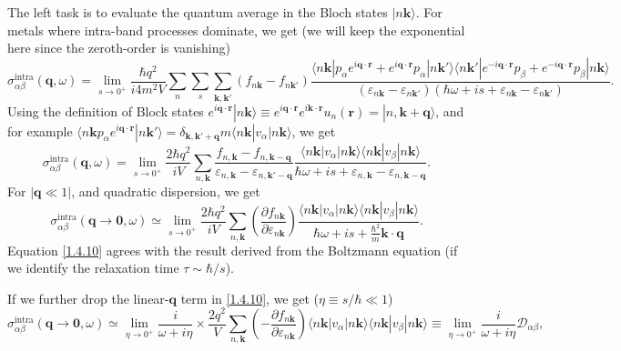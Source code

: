 \documentclass[10pt,nofootinbib,letterpaper]{revtex4}
\begin{document}
		\indent The left task is to evaluate the quantum average in the Bloch states $|n\bm{k}\rangle$. For metals where intra-band processes dominate, we get (we will keep the exponential here since the zeroth-order is vanishing)
		\begin{equation*}
			\sigma_{\alpha\beta}^{\text{intra}}(\bm{q},\omega)=\lim_{s \rightarrow0^+}\dfrac{\hbar q^2}{i4m^2V}\sum_{n}\sum_s\sum_{\bm{k},\bm{k'}}(f_{n\bm{k}}-f_{n\bm{k'}})\dfrac{\langle n\bm{k}|p_\alpha e^{i\bm{q}\cdot\bm{r}}+e^{i\bm{q}\cdot\bm{r}}p_\alpha|n\bm{k'}\rangle\langle n\bm{k'}|e^{-i\bm{q}\cdot\bm{r}}p_\beta+e^{-i\bm{q}\cdot\bm{r}}p_\beta|n\bm{k}\rangle}{(\varepsilon_{n\bm{k}}-\varepsilon_{n\bm{k'}})(\hbar\omega+is+\varepsilon_{n\bm{k}}-\varepsilon_{n\bm{k'}})}.
		\end{equation*}
		Using the definition of Block states $e^{i\bm{q}\cdot\bm{r}}|n\bm{k}\rangle\equiv e^{i\bm{q}\cdot\bm{r}}e^{i\bm{k}\cdot\bm{r}}u_n(\bm{r})=|n,\bm{k}+\bm{q}\rangle$, and for example $\langle n\bm{k}p_\alpha e^{i\bm{q}\cdot\bm{r}}|n\bm{k'}\rangle=\delta_{\bm{k},\bm{k'}+\bm{q}}m\langle n\bm{k}|v_\alpha|n\bm{k}\rangle$, we get
		\begin{equation}\label{1.4.9}
			\sigma_{\alpha\beta}^{\text{intra}}(\bm{q},\omega)=\lim_{s \rightarrow0^+}\dfrac{2\hbar q^2}{iV}\sum_{n,\bm{k}}\dfrac{f_{n,\bm{k}}-f_{n,\bm{k-q}}}{\varepsilon_{n,\bm{k}}-\varepsilon_{n,\bm{k'-q}}}\dfrac{\langle n\bm{k}|v_\alpha|n\bm{k}\rangle \langle n\bm{k}|v_\beta|n\bm{k}\rangle}{\hbar\omega+is+\varepsilon_{n,\bm{k}}-\varepsilon_{n,\bm{k-q}}}.
		\end{equation}
		For $|\bm{q}\ll1|$, and quadratic dispersion, we get
		\begin{equation}\label{1.4.10}
			\sigma_{\alpha\beta}^{\text{intra}}(\bm{q}\rightarrow\bm{0},\omega)\simeq\lim_{s \rightarrow0^+}\dfrac{2\hbar q^2}{iV}\sum_{n,\bm{k}}\left(\dfrac{\partial f_{n\bm{k}}}{\partial \varepsilon_{n\bm{k}}}\right)\dfrac{\langle n\bm{k}|v_\alpha|n\bm{k}\rangle \langle n\bm{k}|v_\beta|n\bm{k}\rangle}{\hbar\omega+is+\frac{\hbar^2}{m}\bm{k}\cdot\bm{q}}.
		\end{equation}
		Equation \eqref{1.4.10} agrees with the result derived from the Boltzmann equation (if we identify the relaxation time $\tau\sim\hbar/s$).\par
		If we further drop the linear-$\bm{q}$ term in \eqref{1.4.10}, we get ($\eta\equiv s/\hbar\ll 1$)
		\begin{equation}\label{1.4.11}
			\sigma_{\alpha\beta}^{\text{intra}}(\bm{q}\rightarrow\bm{0},\omega)\simeq\lim_{\eta \rightarrow0^+}\dfrac{i}{\omega+i\eta}\times\dfrac{2q^2}{V}\sum_{n,\bm{k}}\left(-\dfrac{\partial f_{n\bm{k}}}{\partial \varepsilon_{n\bm{k}}}\right)\langle n\bm{k}|v_\alpha|n\bm{k}\rangle \langle n\bm{k}|v_\beta|n\bm{k}\rangle\equiv\lim_{\eta \rightarrow0^+}\dfrac{i}{\omega+i\eta}\mathcal{D}_{\alpha\beta},
		\end{equation}
\end{document}
